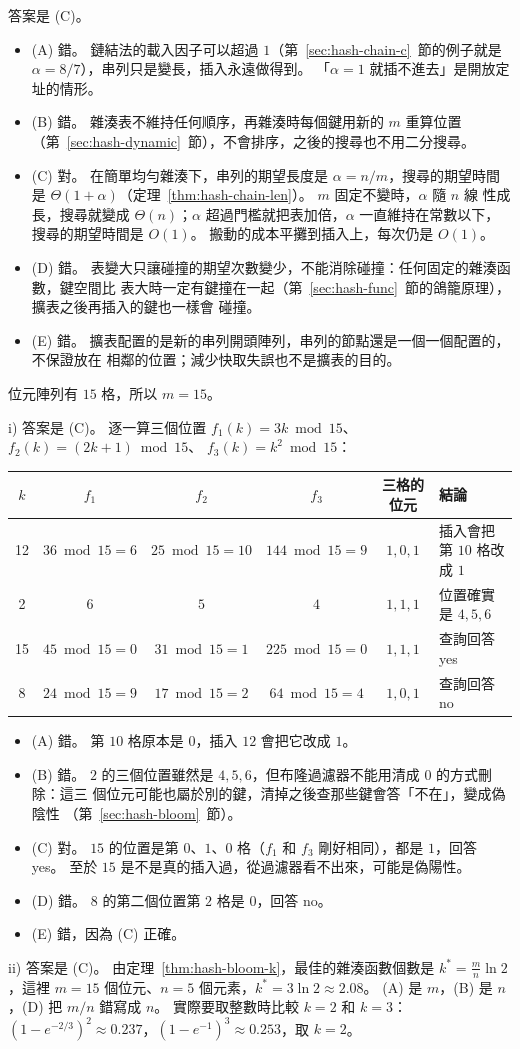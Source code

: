 答案是 (C)。
\begin{itemize}
\item (A) 錯。 鏈結法的載入因子可以超過 $1$（第~\ref{sec:hash-chain-c}~節的例子就是
$\alpha = 8/7$），串列只是變長，插入永遠做得到。 「$\alpha = 1$ 就插不進去」是開放定址的情形。
\item (B) 錯。 雜湊表不維持任何順序，再雜湊時每個鍵用新的 $m$ 重算位置
（第~\ref{sec:hash-dynamic}~節），不會排序，之後的搜尋也不用二分搜尋。
\item (C) 對。 在簡單均勻雜湊下，串列的期望長度是 $\alpha = n/m$，搜尋的期望時間是
$\Theta(1 + \alpha)$（定理~\ref{thm:hash-chain-len}）。 $m$ 固定不變時，$\alpha$ 隨 $n$ 線
性成長，搜尋就變成 $\Theta(n)$；$\alpha$ 超過門檻就把表加倍，$\alpha$ 一直維持在常數以下，
搜尋的期望時間是 $O(1)$。 搬動的成本平攤到插入上，每次仍是 $O(1)$。
\item (D) 錯。 表變大只讓碰撞的期望次數變少，不能消除碰撞：任何固定的雜湊函數，鍵空間比
表大時一定有鍵撞在一起（第~\ref{sec:hash-func}~節的鴿籠原理），擴表之後再插入的鍵也一樣會
碰撞。
\item (E) 錯。 擴表配置的是新的串列開頭陣列，串列的節點還是一個一個配置的，不保證放在
相鄰的位置；減少快取失誤也不是擴表的目的。
\end{itemize}

位元陣列有 $15$ 格，所以 $m = 15$。

i) 答案是 (C)。 逐一算三個位置 $f_1(k) = 3k \bmod 15$、$f_2(k) = (2k + 1) \bmod 15$、
$f_3(k) = k^2 \bmod 15$：
\begin{center}
\small
\begin{tabular}{cccccl}
\toprule
$k$ & $f_1$ & $f_2$ & $f_3$ & 三格的位元 & 結論 \\
\midrule
12 & $36 \bmod 15 = 6$ & $25 \bmod 15 = 10$ & $144 \bmod 15 = 9$ & $1, 0, 1$ & 插入會把第 $10$ 格改成 $1$ \\
2 & $6$ & $5$ & $4$ & $1, 1, 1$ & 位置確實是 $4, 5, 6$ \\
15 & $45 \bmod 15 = 0$ & $31 \bmod 15 = 1$ & $225 \bmod 15 = 0$ & $1, 1, 1$ & 查詢回答 yes \\
8 & $24 \bmod 15 = 9$ & $17 \bmod 15 = 2$ & $64 \bmod 15 = 4$ & $1, 0, 1$ & 查詢回答 no \\
\bottomrule
\end{tabular}
\end{center}
\begin{itemize}
\item (A) 錯。 第 $10$ 格原本是 $0$，插入 $12$ 會把它改成 $1$。
\item (B) 錯。 $2$ 的三個位置雖然是 $4, 5, 6$，但布隆過濾器不能用清成 $0$ 的方式刪除：這三
個位元可能也屬於別的鍵，清掉之後查那些鍵會答「不在」，變成偽陰性
（第~\ref{sec:hash-bloom}~節）。
\item (C) 對。 $15$ 的位置是第 $0$、$1$、$0$ 格（$f_1$ 和 $f_3$ 剛好相同），都是 $1$，回答
yes。 至於 $15$ 是不是真的插入過，從過濾器看不出來，可能是偽陽性。
\item (D) 錯。 $8$ 的第二個位置第 $2$ 格是 $0$，回答 no。
\item (E) 錯，因為 (C) 正確。
\end{itemize}

ii) 答案是 (C)。 由定理~\ref{thm:hash-bloom-k}，最佳的雜湊函數個數是
$k^{*} = \frac{m}{n}\ln 2$，這裡 $m = 15$ 個位元、$n = 5$ 個元素，$k^{*} = 3 \ln 2 \approx
2.08$。 (A) 是 $m$，(B) 是 $n$，(D) 把 $m/n$ 錯寫成 $n$。 實際要取整數時比較 $k = 2$ 和
$k = 3$：$(1 - e^{-2/3})^2 \approx 0.237$，$(1 - e^{-1})^3 \approx 0.253$，取 $k = 2$。
